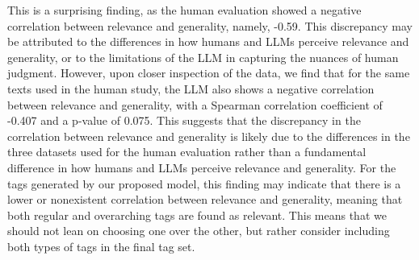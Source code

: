 This is a surprising finding, as the human evaluation showed a negative correlation between relevance and generality, namely, -0.59. This discrepancy may be attributed to the differences in how humans and LLMs perceive relevance and generality, or to the limitations of the LLM in capturing the nuances of human judgment. However, upon closer inspection of the data, we find that for the same texts used in the human study, the LLM also shows a negative correlation between relevance and generality, with a Spearman correlation coefficient of -0.407 and a p-value of 0.075. This suggests that the discrepancy in the correlation between relevance and generality is likely due to the differences in the three datasets used for the human evaluation rather than a fundamental difference in how humans and LLMs perceive relevance and generality. For the tags generated by our proposed model, this finding may indicate that there is a lower or nonexistent correlation between relevance and generality, meaning that both regular and overarching tags are found as relevant. This means that we should not lean on choosing one over the other, but rather consider including both types of tags in the final tag set.





